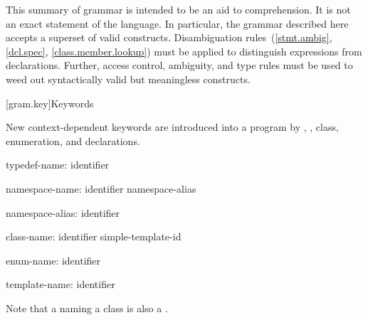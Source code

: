 
\pnum
{}%
%
This summary of \Cpp{} grammar is intended to be an aid to comprehension.
It is not an exact statement of the language.
In particular, the grammar described here accepts
a superset of valid \Cpp{} constructs.
Disambiguation rules~(\ref{stmt.ambig}, \ref{dcl.spec}, \ref{class.member.lookup})
must be applied to distinguish expressions from declarations.
Further, access control, ambiguity, and type rules must be used
to weed out syntactically valid but meaningless constructs.

[gram.key]{Keywords}

\pnum
{}%
New context-dependent keywords are introduced into a program by
,
,
class, enumeration, and
declarations.

\begin{ncbnf}
typedef-name:\br
	identifier
\end{ncbnf}

\begin{ncbnf}
namespace-name:\br
	identifier\br
	namespace-alias

namespace-alias:\br
	identifier
\end{ncbnf}

\begin{ncbnf}
class-name:\br
	identifier\br
	simple-template-id
\end{ncbnf}

\begin{ncbnf}
enum-name:\br
	identifier
\end{ncbnf}

\begin{ncbnf}
template-name:\br
	identifier
\end{ncbnf}

Note that a
naming a class is also a
.

\FlushAndPrintGrammar
